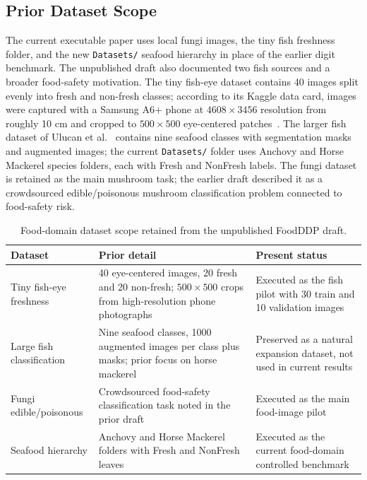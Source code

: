 ﻿\documentclass[6p,10pt,times]{ieeeaccess}
\begin{document}
\subsection{Prior Dataset Scope}

The current executable paper uses local fungi images, the tiny fish freshness folder, and the new \texttt{Datasets/} seafood hierarchy in place of the earlier digit benchmark. The unpublished draft also documented two fish sources and a broader food-safety motivation. The tiny fish-eye dataset contains 40 images split evenly into fresh and non-fresh classes; according to its Kaggle data card, images were captured with a Samsung A6+ phone at \(4608\times3456\) resolution from roughly 10 cm and cropped to \(500\times500\) eye-centered patches~\cite{agustyawan2020fish}. The larger fish dataset of Ulucan et al.~\cite{ulucan2020fish} contains nine seafood classes with segmentation masks and augmented images; the current \texttt{Datasets/} folder uses Anchovy and Horse Mackerel species folders, each with Fresh and NonFresh labels. The fungi dataset is retained as the main mushroom task; the earlier draft described it as a crowdsourced edible/poisonous mushroom classification problem connected to food-safety risk.

\begin{table}[t]
\centering
\caption{Food-domain dataset scope retained from the unpublished FoodDDP draft.}
\label{tab:legacydatasets}
\small
\begin{tabular}{p{}p{}p{}}
\toprule
Dataset & Prior detail & Present status \\
\midrule
Tiny fish-eye freshness & 40 eye-centered images, 20 fresh and 20 non-fresh; \(500\times500\) crops from high-resolution phone photographs~\cite{agustyawan2020fish} & Executed as the fish pilot with 30 train and 10 validation images \\
Large fish classification & Nine seafood classes, 1000 augmented images per class plus masks; prior focus on horse mackerel~\cite{ulucan2020fish} & Preserved as a natural expansion dataset, not used in current results \\
Fungi edible/poisonous & Crowdsourced food-safety classification task noted in the prior draft & Executed as the main food-image pilot \\
Seafood hierarchy & Anchovy and Horse Mackerel folders with Fresh and NonFresh leaves & Executed as the current food-domain controlled benchmark \\
\bottomrule
\end{tabular}
\end{table}
\end{document}
